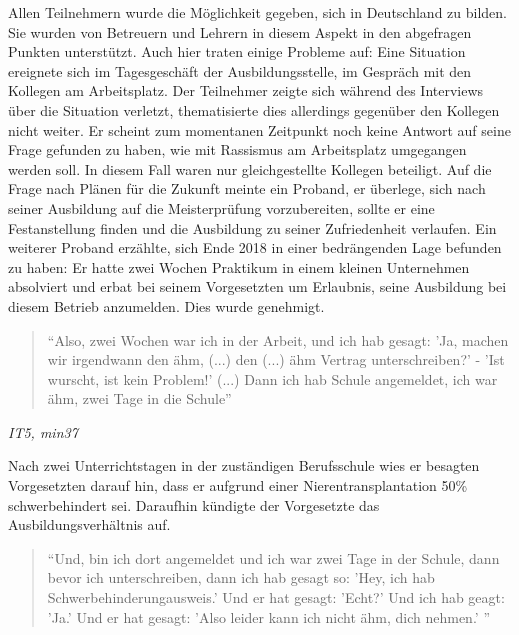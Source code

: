 Allen Teilnehmern wurde die Möglichkeit gegeben, sich in Deutschland zu bilden. Sie wurden von Betreuern und Lehrern in diesem Aspekt in den abgefragen Punkten unterstützt.
Auch hier traten einige Probleme auf:
Eine Situation ereignete sich im Tagesgeschäft der Ausbildungsstelle, im Gespräch mit den Kollegen am Arbeitsplatz. Der Teilnehmer zeigte sich während des Interviews über die Situation verletzt, thematisierte dies allerdings gegenüber den Kollegen nicht weiter.\newline
Er scheint zum momentanen Zeitpunkt noch keine Antwort auf seine Frage gefunden zu haben, wie mit Rassismus am Arbeitsplatz umgegangen werden soll. In diesem Fall waren nur gleichgestellte Kollegen beteiligt.\newline
Auf die Frage nach Plänen für die Zukunft meinte ein Proband, er überlege, sich nach seiner Ausbildung auf die Meisterprüfung vorzubereiten, sollte er eine Festanstellung finden und die Ausbildung zu seiner Zufriedenheit verlaufen.
Ein weiterer Proband erzählte, sich Ende 2018 in einer bedrängenden Lage befunden zu haben:
Er hatte zwei Wochen Praktikum in einem kleinen Unternehmen absolviert und erbat bei seinem Vorgesetzten um Erlaubnis, seine Ausbildung bei diesem Betrieb anzumelden. Dies wurde genehmigt.\newline
\begin{quote}
    ``Also, zwei Wochen war ich in der Arbeit, und ich hab gesagt: 'Ja, machen wir irgendwann den ähm, (...) den (...) ähm Vertrag unterschreiben?' - 'Ist wurscht, ist kein Problem!' (...) Dann ich hab Schule angemeldet, ich war ähm, zwei Tage in die Schule''
\end{quote}
\centerline{\textit{IT5, min37}}
Nach zwei Unterrichtstagen in der zuständigen Berufsschule wies er besagten Vorgesetzten darauf hin, dass er aufgrund einer Nierentransplantation 50\% schwerbehindert sei. Daraufhin kündigte der Vorgesetzte das Ausbildungsverhältnis auf.
\begin{quote}
    ``Und, bin ich dort angemeldet und ich war zwei Tage in der Schule, dann bevor ich unterschreiben, dann ich hab gesagt so: 'Hey, ich hab Schwerbehinderungausweis.' Und er hat gesagt: 'Echt?' Und ich hab geagt: 'Ja.' Und er hat gesagt: 'Also leider kann ich nicht ähm, dich nehmen.' ''
\end{quote}
